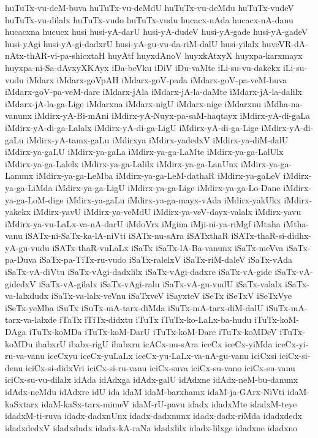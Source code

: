 {huTuTx-vu-deM-buva
huTuTx-vu-deMdU
huTuTx-vu-deMdu
huTuTx-vudeV
huTuTx-vu-dilalx
huTuTx-vudo
huTuTx-vudu
hucacx-nAda
hucacx-nA-danu
hucacxna
hucucx
husi
husi-yA-darU
husi-yA-dudeV
husi-yA-gade
husi-yA-gadeV
husi-yAgi
husi-yA-gi-dadxrU
husi-yA-gu-vu-da-riM-dalU
husi-yilalx
huveVR-dA-nAtx-thAR-vi-pa-shicxtaH
huyAtf
huyxdAnoV
huyxkAtxyX
huyxpa-karxmayx
huyxpa-ni-Sa-dAvxyXKAyx
iDa-beVku
iDiV
iDu-vaMte
iLi-su-vu-dakekx
iLi-su-vudu
iMdarx
iMdarx-goVpAH
iMdarx-goV-pada
iMdarx-goV-pa-veM-buva
iMdarx-goV-pa-veM-dare
iMdarx-jAla
iMdarx-jA-la-daMte
iMdarx-jA-la-dalilx
iMdarx-jA-la-ga-Lige
iMdarxna
iMdarx-nigU
iMdarx-nige
iMdarxnu
iMdha-na-vanunx
iMdirx-yA-Bi-mAni
iMdirx-yA-Nuyx-pa-saM-haqtayx
iMdirx-yA-di-gaLa
iMdirx-yA-di-ga-Lalalx
iMdirx-yA-di-ga-LigU
iMdirx-yA-di-ga-Lige
iMdirx-yA-di-gaLu
iMdirx-yA-tamx-gaLu
iMdirxya
iMdirx-yadedxV
iMdirx-ya-diM-dalU
iMdirx-ya-gaLU
iMdirx-ya-gaLa
iMdirx-ya-ga-LaMte
iMdirx-ya-ga-LalUlx
iMdirx-ya-ga-Lalelx
iMdirx-ya-ga-Lalilx
iMdirx-ya-ga-LanUnx
iMdirx-ya-ga-Lanunx
iMdirx-ya-ga-LeMba
iMdirx-ya-ga-LeM-dathaR
iMdirx-ya-gaLeV
iMdirx-ya-ga-LiMda
iMdirx-ya-ga-LigU
iMdirx-ya-ga-Lige
iMdirx-ya-ga-Lo-Dane
iMdirx-ya-ga-LoM-dige
iMdirx-ya-gaLu
iMdirx-ya-ga-mayx-vAda
iMdirx-yakUkx
iMdirx-yakekx
iMdirx-yavU
iMdirx-ya-veMdU
iMdirx-ya-veV-dayx-valalx
iMdirx-yavu
iMdirx-ya-vu-LaLx-va-nA-darU
iMdoVrx
iMgina
iMji-ni-ya-riMgf
iMtaha
iMtha-vanu
iSATx-ni-SaTx-ka-lA-niVti
iSATx-nu-sAra
iSATxthaR
iSATx-thaR-si-didhx-yA-gu-vudu
iSATx-thaR-vuLaLx
iSaTx
iSaTx-lA-Ba-vanunx
iSaTx-meVva
iSaTx-pa-Duva
iSaTx-pa-TiTx-ru-vudo
iSaTx-ralelxV
iSaTx-riM-daleV
iSaTx-vAda
iSaTx-vA-diVtu
iSaTx-vAgi-dadxlilx
iSaTx-vAgi-dadxre
iSaTx-vA-gide
iSaTx-vA-gidedxV
iSaTx-vA-gilalx
iSaTx-vAgi-ralu
iSaTx-vA-gu-vudU
iSaTx-valalx
iSaTx-va-lalxdudx
iSaTx-va-lalx-veVnu
iSaTxveV
iSayxteV
iSeTx
iSeTxV
iSeTxVye
iSeTx-yeMba
iSuTx
iSuTx-mA-tarx-diMda
iSuTx-mA-tarx-diM-dalU
iSuTx-mA-tarx-va-lalxde
iTaTx
iTiTx-didxtu
iTuTx
iTuTx-ko-LaLx-ba-hudu
iTuTx-koM-DAga
iTuTx-koMDa
iTuTx-koM-DarU
iTuTx-koM-Dare
iTuTx-koMDeV
iTuTx-koMDu
ibabxrU
ibabx-rigU
ibabxru
icACx-nu-sAra
iceCx
iceCx-yiMda
iceCx-yi-ru-va-vanu
iceCxyu
iceCx-yuLaLx
iceCx-yu-LaLx-va-nA-gu-vanu
iciCxsi
iciCx-si-denu
iciCx-si-didxVri
iciCx-si-ru-vanu
iciCx-suva
iciCx-su-vano
iciCx-su-vanu
iciCx-su-vu-dilalx
idAda
idAdxga
idAdx-galU
idAdxne
idAdx-neM-bu-danunx
idAdx-neMdu
idAdxre
idU
ida
idaM
idaM-barxhamx
idaM-ja-GArx-NiVti
idaM-kaSxtarx
idaM-kaSx-tarx-mimeV
idaM-rU-pavu
idadx
idadxMte
idadxM-teye
idadxM-ti-ruva
idadx-dadxnUnx
idadx-dadxnunx
idadx-dadx-riMda
idadxdedx
idadxdedxV
idadxdudx
idadx-kA-raNa
idadxlilx
idadx-lilxge
idadxne
idadxno
}
